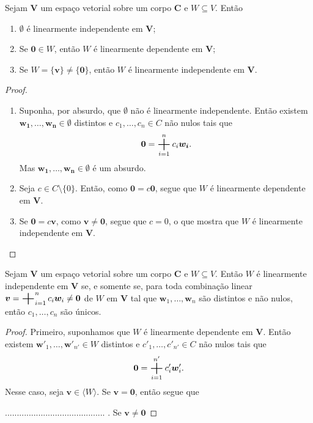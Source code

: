 \begin{prop}
	Sejam $\bm V$ um espaço vetorial sobre um corpo $\bm C$ e $W \subseteq V$. Então
	\begin{enumerate}
	\item $\emptyset$ é linearmente independente em $\bm V$;
	\item Se $\bm 0 \in W$, então $W$ é linearmente dependente em $\bm V$;
	\item Se $W=\{\bm v\}\neq\{\bm 0\}$, então $W$ é linearmente independente em $\bm V$.
	\end{enumerate}
\end{prop}
\begin{proof}
	\begin{enumerate}
	\item Suponha, por absurdo, que $\emptyset$ não é linearmente independente. Então existem $\bm{w_1},\ldots,\bm{w_n} \in \emptyset$ distintos e $c_1,\ldots,c_n \in C$ não nulos tais que
	\begin{equation*}
	\bm 0 = \bigsum_{i=1}^n c_i\bm{w_i}.
	\end{equation*}
Mas $\bm{w_1},\ldots,\bm{w_n} \in \emptyset$ é um absurdo.
	\item Seja $c \in C \setminus \{0\}$. Então, como $\bm 0 = c \bm 0$, segue que $W$ é linearmente dependente em $\bm V$.
	\item Se $\bm 0 = c\bm v$, como $\bm v \neq \bm 0$, segue que $c=0$, o que mostra que $W$ é linearmente independente em $\bm V$.
	\qedhere
	\end{enumerate}
\end{proof}

\begin{prop}
	Sejam $\bm V$ um espaço vetorial sobre um corpo $\bm C$ e $W \subseteq V$. Então $W$ é linearmente independente em $\bm V$ se, e somente se, para toda combinação linear $\bm v = \bigsum_{i=1}^n c_i\bm w_i \neq \bm 0$ de $W$ em $\bm V$ tal que $\bm w_1,\ldots,\bm w_n$ são distintos e não nulos, então $c_1,\ldots,c_n$ são únicos.
\end{prop}
\begin{proof}
	Primeiro, suponhamos que $W$ é linearmente dependente em $\bm V$. Então existem $\bm w'_1, \ldots,\bm w'_{n'} \in W$ distintos e $c'_1,\ldots,c'_{n'} \in C$ não nulos tais que
	\begin{equation*}
	\bm 0 = \bigsum_{i=1}^{n'} c'_i\bm w'_i.
	\end{equation*}
Nesse caso, seja $\bm v \in \langle W \rangle$. Se $\bm v = \bm 0$, então segue que









 .......................................... . Se $\bm v \neq \bm 0$










\end{proof}

